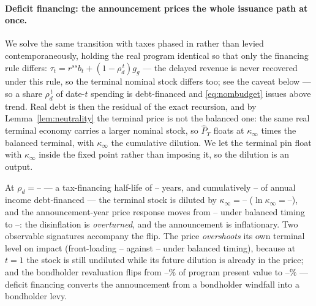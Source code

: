 \documentclass[12pt]{article}
\providecommand{\pendingnum}{\textit{--}}
\providecommand{\DefRho}{\pendingnum}\providecommand{\DefHalfLife}{\pendingnum}
\providecommand{\DefKappa}{\pendingnum}\providecommand{\DefLnKappa}{\pendingnum}
\providecommand{\DefBal}{\pendingnum}\providecommand{\DefImp}{\pendingnum}
\providecommand{\DefFrontBal}{\pendingnum}\providecommand{\DefFrontDef}{\pendingnum}
\providecommand{\DefCumGap}{\pendingnum}\providecommand{\DefRevalBal}{\pendingnum}
\providecommand{\DefRevalDef}{\pendingnum}\providecommand{\DefKapStar}{\pendingnum}
\begin{document}
\paragraph{Deficit financing: the announcement prices the whole issuance
path at once.} We solve the same transition with taxes phased in rather
than levied contemporaneously, holding the real program identical so that
only the financing rule differs: $\tau_t = r^{ss}b_t + (1-\rho_d^{\,t})g_{g}$
--- the delayed revenue is never recovered under this rule, so the terminal
nominal stock differs too; see the caveat below ---
so a share $\rho_d^{\,t}$ of date-$t$ spending is debt-financed and
\eqref{eq:nombudget} issues above trend. Real debt is then the residual of
the exact recursion, and by Lemma~\ref{lem:neutrality} the terminal price
is not the balanced one: the same real terminal economy carries a larger
nominal stock, so $\hat P_T$ floats at $\kappa_\infty$ times the balanced
terminal, with $\kappa_\infty$ the cumulative dilution. We let the terminal
pin float with $\kappa_\infty$ inside the fixed point rather than imposing
it, so the dilution is an output.

At $\rho_d=\DefRho$ --- a tax-financing half-life of $\DefHalfLife$ years,
and cumulatively $\DefCumGap$ of annual income debt-financed --- the
terminal stock is diluted by $\kappa_\infty=\DefKappa$
($\ln\kappa_\infty=\DefLnKappa$), and the announcement-year price response
moves from $\DefBal$ under balanced timing to $\DefImp$: the disinflation
is \emph{overturned}, and the announcement is inflationary. Two observable
signatures accompany the flip. The price \emph{overshoots} its own terminal
level on impact (front-loading $\DefFrontDef$ against $\DefFrontBal$ under
balanced timing), because at $t=1$ the stock is still undiluted while its
future dilution is already in the price; and the bondholder revaluation
flips from $\DefRevalBal\%$ of program present value to $\DefRevalDef\%$
--- deficit financing converts the announcement from a bondholder windfall
into a bondholder levy.
\end{document}
